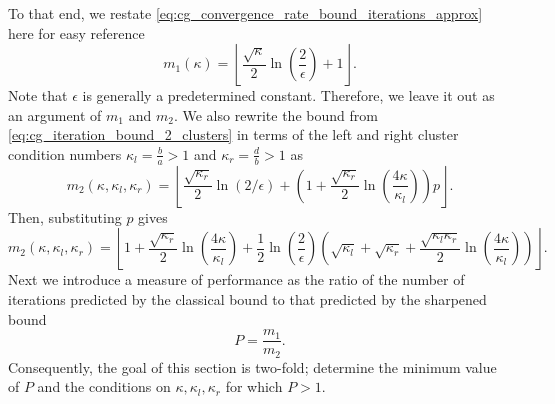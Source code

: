 To that end, we restate \cref{eq:cg_convergence_rate_bound_iterations_approx} here for easy reference
\[
    m_1(\kappa) = \left\lfloor\frac{\sqrt{\kappa}}{2}\ln\left(\frac{2}{\epsilon}\right) + 1\right\rfloor.
\]
Note that $\epsilon$ is generally a predetermined constant. Therefore, we leave it out as an argument of $m_1$ and $m_2$. We also rewrite the bound from \cref{eq:cg_iteration_bound_2_clusters} in terms of the left and right cluster condition numbers $\kappa_l = \frac{b}{a} > 1$ and $\kappa_r = \frac{d}{b} > 1$ as
\[
    m_2(\kappa, \kappa_l, \kappa_r)=\left\lfloor\frac{\sqrt{\kappa_r}}{2} \ln (2 / \epsilon)+\left(1+\frac{\sqrt{\kappa_r}}{2} \ln \left(\frac{4\kappa}{\kappa_l}\right)\right) p\right\rfloor.
\]
Then, substituting $p$ gives
\begin{equation}
    m_2(\kappa, \kappa_l, \kappa_r)=\left\lfloor
    1
    + \frac{\sqrt{\kappa_r}}{2}\ln\left(\frac{4\kappa}{\kappa_l}\right)
    + \frac{1}{2}\ln\left(\frac{2}{\epsilon}\right)\left(
    \sqrt{\kappa_l}
    + \sqrt{\kappa_r}
    + \frac{\sqrt{\kappa_l\kappa_r}}{2}\ln\left(\frac{4\kappa}{\kappa_l}\right)
    \right)
    \right\rfloor.
    \label{eq:cg_iteration_bound_2_clusters_condition_numbers}
\end{equation}
Next we introduce a measure of performance as the ratio of the number of iterations predicted by the classical bound to that predicted by the sharpened bound
\begin{equation}
    P = \frac{m_1}{m_2}.
    \label{eq:performance_ratio}
\end{equation}
Consequently, the goal of this section is two-fold; determine the minimum value of $P$ and the conditions on $\kappa,\kappa_l,\kappa_r$ for which $P > 1$.

